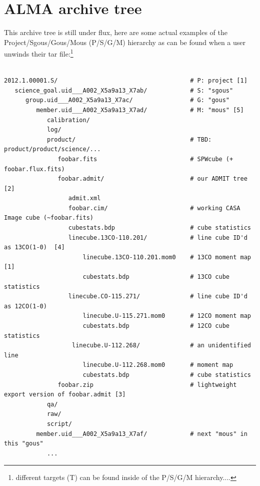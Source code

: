 \documentclass[preprint]{aastex}
\begin{document}


\section{ALMA archive tree}

This archive tree is still under flux, here are some actual examples
of the Project/Sgous/Gous/Mous (P/S/G/M) hierarchy as can be found when a user
unwinds their tar file:\footnote{different targets (T) can be found inside of the
P/S/G/M hierarchy....}



\footnotesize
\begin{verbatim}

2012.1.00001.S/                                     # P: project [1]
   science_goal.uid___A002_X5a9a13_X7ab/            # S: "sgous"
      group.uid___A002_X5a9a13_X7ac/                # G: "gous"
         member.uid___A002_X5a9a13_X7ad/            # M: "mous" [5]
            calibration/
            log/
            product/                                # TBD: product/product/science/...
               foobar.fits                          # SPWcube (+ foobar.flux.fits)
               foobar.admit/                        # our ADMIT tree [2]
                  admit.xml
                  foobar.cim/                       # working CASA Image cube (~foobar.fits)
                  cubestats.bdp                     # cube statistics
                  linecube.13CO-110.201/            # line cube ID'd as 13CO(1-0)  [4]
                      linecube.13CO-110.201.mom0    # 13CO moment map [1]
                      cubestats.bdp                 # 13CO cube statistics
                  linecube.CO-115.271/              # line cube ID'd as 12CO(1-0)
                      linecube.U-115.271.mom0       # 12CO moment map
                      cubestats.bdp                 # 12CO cube statistics
                   linecube.U-112.268/              # an unidentified line
                      linecube.U-112.268.mom0       # moment map
                      cubestats.bdp                 # cube statistics
               foobar.zip                           # lightweight export version of foobar.admit [3]
            qa/
            raw/
            script/
         member.uid___A002_X5a9a13_X7af/            # next "mous" in this "gous"
            ...            
\end{verbatim}
\end{document}

